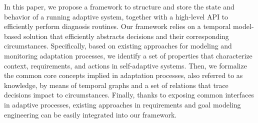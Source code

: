 In this paper, we propose a framework to structure and store the state and behavior of a running adaptive system, together with a high-level API to efficiently perform diagnosis routines. 
Our framework relies on a temporal model-based solution that efficiently abstracts decisions and their corresponding circumstances.
Specifically, based on existing approaches for modeling and monitoring adaptation processes, we identify a set of properties that characterize context, requirements, and actions in self-adaptive systems.    
Then, we formalize the common core concepts implied in adaptation processes, also referred to as knowledge, by means of temporal graphs and a set of relations that trace decisions impact to circumstances. Finally, thanks to exposing common interfaces in adaptive processes, existing approaches in requirements and goal modeling engineering can be easily integrated into our framework. 




